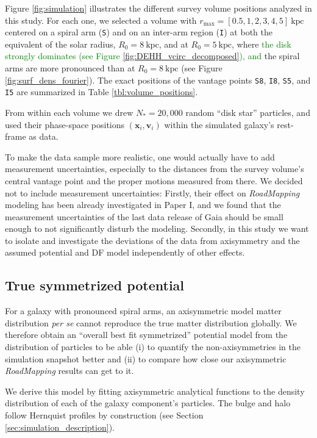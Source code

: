 \documentclass[iop,revtex4,numberedappendix,appendixfloats]{emulateapj}
\newcommand{\vect}[1]{\boldsymbol{#1}}
\newcommand{\RM}{{\sl RoadMapping}}
\newcommand{\NEW}[1]{\textcolor{Green}{#1}}
\newcommand{\OLD}[1]{}
\begin{document}
Figure \ref{fig:simulation} illustrates the different survey volume positions analyzed in this study. For each one, we selected a volume with $r_\text{max}=[0.5,1,2,3,4,5]~\text{kpc}$ centered on a spiral arm (\texttt{S}) and on an inter-arm region (\texttt{I}) at both the equivalent of the solar radius, $R_0=8~\text{kpc}$, and at $R_0=5~\text{kpc}$, where \NEW{the disk strongly dominates (see Figure \ref{fig:DEHH_vcirc_decomposed}), and} the spiral arms are more pronounced than at $R_0=8~\text{kpc}$ (see Figure \OLD{\ref{fig:spiral_arm_DeltaS}}\NEW{\ref{fig:surf_dens_fourier}}). The exact positions of the vantage points \texttt{S8}, \texttt{I8}, \texttt{S5}, and \texttt{I5} are summarized in Table \ref{tbl:volume_positions}.

From within each volume we drew $N_*=20,000$ random ``disk star'' particles, and used their phase-space positions $(\vect{x}_i,\vect{v}_i)$ within the simulated galaxy's rest-frame as data. 

To make the data sample more realistic, one would actually have to add measurement uncertainties, especially to the distances from the survey volume's central vantage point and the proper motions measured from there. We decided not to include measurement uncertainties: Firstly, their effect on \RM{} modeling has been already investigated in Paper I, and we found that the measurement uncertainties of the last data release of Gaia should be small enough to not significantly disturb the modeling. Secondly, in this study we want to isolate and investigate the deviations of the data from axisymmetry and the assumed potential and DF model independently of other effects.

\subsection{True symmetrized potential} \label{sec:DEHH-Pot}

For a galaxy with pronounced spiral arms, an axisymmetric model matter distribution \emph{per se} cannot reproduce the true matter distribution globally. We therefore obtain an ``overall best fit symmetrized'' potential model from the distribution of particles to be able (i) to quantify the non-axisymmetries in the simulation snapshot better and (ii) to compare how close our axisymmetric \RM{} results can get to it. 

We derive this model by fitting axisymmetric analytical functions to the density distribution of each of the galaxy component's particles. The bulge and halo follow Hernquist profiles by construction (see Section \ref{sec:simulation_description}).
\end{document}
